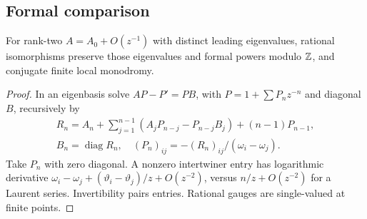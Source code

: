 \subsection{Formal comparison}\label{app:formal}
\begin{lemma}\label{lem:formal}
For rank-two $A=A_0+O(z^{-1})$ with distinct leading eigenvalues,
rational isomorphisms preserve those eigenvalues and formal powers modulo
$\mathbb{Z}$, and conjugate finite local monodromy.
\end{lemma}
\begin{proof}
In an eigenbasis solve $AP-P'=PB$, with $P=1+\sum P_nz^{-n}$ and
diagonal $B$, recursively by
\begin{equation}\label{eq:core-formal-recursion}
\begin{gathered}
R_n=A_n+\sum_{j=1}^{n-1}(A_jP_{n-j}-P_{n-j}B_j)+(n-1)P_{n-1},\\
B_n=\operatorname{diag}R_n,\quad(P_n)_{ij}=-(R_n)_{ij}/(\omega_i-\omega_j).
\end{gathered}
\end{equation}
Take $P_n$ with zero diagonal. A nonzero intertwiner entry has logarithmic
derivative $\omega_i-\omega_j+(\vartheta_i-\vartheta_j)/z+O(z^{-2})$,
versus $n/z+O(z^{-2})$ for a Laurent series. Invertibility pairs entries. Rational gauges are single-valued at finite points.
\end{proof}

